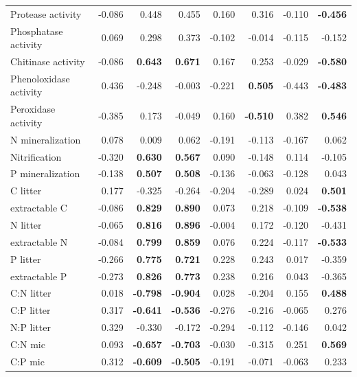 \documentclass[10pt]{article}
\begin{document}
\begin{flushleft}
\begin{landscape}
\begin{table}[h!]
{\begin{tabular}{lrrrrrrr}
  Protease activity & -0.086 & 0.448 & 0.455 & 0.160 & 0.316 & -0.110 & \textbf{ -0.456 } \\ 
  Phosphatase activity & 0.069 & 0.298 & 0.373 & -0.102 & -0.014 & -0.115 & -0.152 \\ 
  Chitinase activity & -0.086 & \textbf{ 0.643 } & \textbf{ 0.671 } & 0.167 & 0.253 & -0.029 & \textbf{ -0.580 } \\ 
  Phenoloxidase activity & 0.436 & -0.248 & -0.003 & -0.221 & \textbf{ 0.505 } & -0.443 & \textbf{ -0.483 } \\ 
  Peroxidase activity & -0.385 & 0.173 & -0.049 & 0.160 & \textbf{ -0.510 } & 0.382 & \textbf{ 0.546 } \\ 
  N mineralization & 0.078 & 0.009 & 0.062 & -0.191 & -0.113 & -0.167 & 0.062 \\ 
  Nitrification & -0.320 & \textbf{ 0.630 } & \textbf{ 0.567 } & 0.090 & -0.148 & 0.114 & -0.105 \\ 
  P mineralization & -0.138 & \textbf{ 0.507 } & \textbf{ 0.508 } & -0.136 & -0.063 & -0.128 & 0.043 \\ 
  C litter & 0.177 & -0.325 & -0.264 & -0.204 & -0.289 & 0.024 & \textbf{ 0.501 } \\ 
  extractable C & -0.086 & \textbf{ 0.829 } & \textbf{ 0.890 } & 0.073 & 0.218 & -0.109 & \textbf{ -0.538 } \\ 
  N litter & -0.065 & \textbf{ 0.816 } & \textbf{ 0.896 } & -0.004 & 0.172 & -0.120 & -0.431 \\ 
  extractable N & -0.084 & \textbf{ 0.799 } & \textbf{ 0.859 } & 0.076 & 0.224 & -0.117 & \textbf{ -0.533 } \\ 
  P litter & -0.266 & \textbf{ 0.775 } & \textbf{ 0.721 } & 0.228 & 0.243 & 0.017 & -0.359 \\ 
  extractable P & -0.273 & \textbf{ 0.826 } & \textbf{ 0.773 } & 0.238 & 0.216 & 0.043 & -0.365 \\ 
  C:N litter & 0.018 & \textbf{ -0.798 } & \textbf{ -0.904 } & 0.028 & -0.204 & 0.155 & \textbf{ 0.488 } \\ 
  C:P litter & 0.317 & \textbf{ -0.641 } & \textbf{ -0.536 } & -0.276 & -0.216 & -0.065 & 0.276 \\ 
  N:P litter & 0.329 & -0.330 & -0.172 & -0.294 & -0.112 & -0.146 & 0.042 \\ 
  C:N mic & 0.093 & \textbf{ -0.657 } & \textbf{ -0.703 } & -0.030 & -0.315 & 0.251 & \textbf{ 0.569 } \\ 
  C:P mic & 0.312 & \textbf{ -0.609 } & \textbf{ -0.505 } & -0.191 & -0.071 & -0.063 & 0.233 \\ 

\end{tabular}}
\end{table}
\end{landscape}
\end{flushleft}
\end{document}
